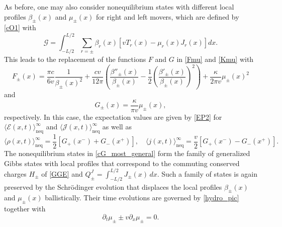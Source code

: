 \documentclass[12pt,a4paper]{article}
\newcommand{\cE}{\mathcal{E}}
\newcommand{\cG}{\mathcal{G}}
\newcommand{\cJ}{\mathcal{J}}
\theoremstyle{definition}
\theoremstyle{remark}
\begin{document}
As before, one may also consider nonequilibrium states with different local profiles $\beta_{\pm}(x)$ and $\mu_{\pm}(x)$ for right and left movers, which are defined by \eqref{cO1} with
%
\begin{equation}
\label{cG_most_general}
\cG
= \int_{-L/2}^{L/2} \sum_{r = \pm} \beta_{r}(x)
	\left[ v T_{r}(x) - \mu_{r}(x) J_{r}(x) \right] dx.
\end{equation}
%
This leads to the replacement of the functions $F$ and $G$ in \eqref{Fmu} and \eqref{Kmu} with
%
\begin{equation}
F_{\pm}(x)
= \frac{\pi c}{6v} \frac{1}{\beta_{\pm}(x)^2}
	+ \frac{cv}{12\pi} \left(
			\frac{\beta''_{\pm}(x)}{\beta_{\pm}(x)}
			- \frac{1}{2} \left( \frac{\beta'_{\pm}(x)}{\beta_{\pm}(x)} \right)^2
		\right)
	+ \frac{\kappa}{2\pi v}\mu_{\pm}(x)^2
\end{equation}
%
and
%
\begin{equation}
G_{\pm}(x) = \frac{\kappa}{\pi v} \mu_{\pm}(x),
\end{equation}
%
respectively.
In this case, the expectation values are given by \eqref{EP2} for $\bigl\langle \cE(x,t) \bigr\rangle^\infty_{\text{neq}}$ and 
$\bigl\langle \cJ(x,t) \bigr\rangle^\infty_{\text{neq}}$ as well as
%
\begin{equation}
\bigl\langle \rho(x,t) \bigr\rangle^\infty_{\text{neq}}
= \frac{1}{2} \left[ G_{+}(x^-) + G_{-}(x^+) \right],
\quad
\bigl\langle j(x,t) \bigr\rangle^\infty_{\text{neq}}
= \frac{v}{2} \left[ G_{+}(x^-) - G_{-}(x^+) \right].
\end{equation}
%
The nonequilibrium states in \eqref{cG_most_general} form the family of generalized Gibbs states with local profiles that correspond to the commuting conserved charges $H_{\pm}$ of \eqref{GGE} and $Q^{J}_{\pm}= \int_{-L/2}^{L/2}
J_{\pm}(x) \, dx$.
Such a family of states is again preserved by the
Schr\"odinger evolution
that displaces the local profiles $\beta_{\pm}(x)$ and $\mu_{\pm}(x)$ ballistically.
Their time evolutions are governed by \eqref{hydro_pic} together with
%
\begin{equation}
\partial_{t} \mu_{\pm} \pm v \partial_{x} \mu_{\pm} = 0.
\end{equation}
%
\end{document}
